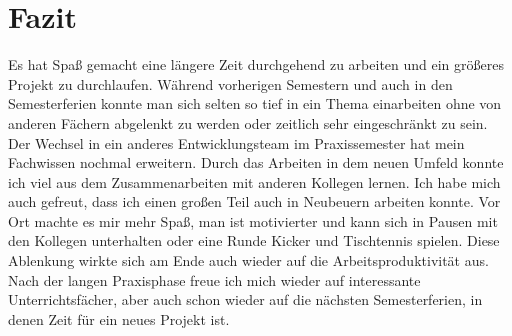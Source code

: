 \section{Fazit}
Es hat Spaß gemacht eine längere Zeit durchgehend zu arbeiten und ein größeres Projekt zu durchlaufen. Während vorherigen Semestern und auch in den Semesterferien konnte man sich selten so tief in ein Thema einarbeiten ohne von anderen Fächern abgelenkt zu werden oder zeitlich sehr eingeschränkt zu sein.
Der Wechsel in ein anderes Entwicklungsteam im Praxissemester hat mein Fachwissen nochmal erweitern. Durch das Arbeiten in dem neuen Umfeld konnte ich viel aus dem Zusammenarbeiten mit anderen Kollegen lernen. 
Ich habe mich auch gefreut, dass ich einen großen Teil auch in Neubeuern arbeiten konnte. Vor Ort machte es mir mehr Spaß, man ist motivierter und kann sich in Pausen mit den Kollegen unterhalten oder eine Runde Kicker und Tischtennis spielen. Diese Ablenkung wirkte sich am Ende auch wieder auf die Arbeitsproduktivität aus. Nach der langen Praxisphase freue ich mich wieder auf interessante Unterrichtsfächer, aber auch schon wieder auf die nächsten Semesterferien, in denen Zeit für ein neues Projekt ist.